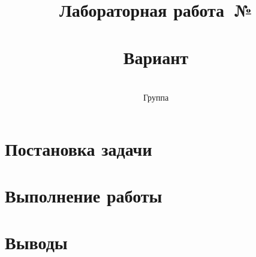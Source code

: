 \documentclass[12pt,a4paper]{article}
\title{Лабораторная работа\ifx\labnumber\empty\else~№\labnumber\fi\\
\labtopic\ifx\labvariant\empty\else\\Вариант \labvariant\fi}
\author{\labauthor\ifx\labgroup\empty\else\\Группа \labgroup\fi}
\date{\labdate}
\begin{document}
\maketitle
\newpage
\tableofcontents
\newpage

\section{Постановка задачи}

\section{Выполнение работы}

\section{Выводы}
\end{document}
